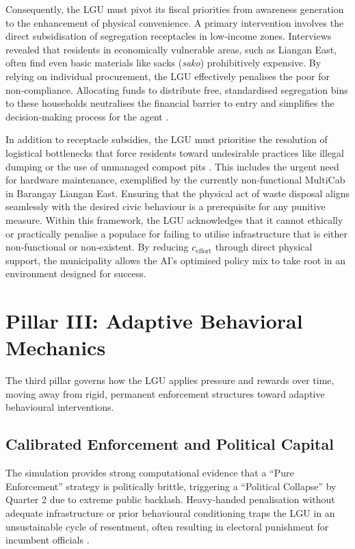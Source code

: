 Consequently, the LGU must pivot its fiscal priorities from awareness generation to the enhancement of physical convenience. A primary intervention involves the direct subsidisation of segregation receptacles in low‑income zones. Interviews revealed that residents in economically vulnerable areas, such as Liangan East, often find even basic materials like sacks (\textit{sako}) prohibitively expensive. By relying on individual procurement, the LGU effectively penalises the poor for non‑compliance. Allocating funds to distribute free, standardised segregation bins to these households neutralises the financial barrier to entry and simplifies the decision‑making process for the agent \citep{Thaler2008}.

In addition to receptacle subsidies, the LGU must prioritise the resolution of logistical bottlenecks that force residents toward undesirable practices like illegal dumping or the use of unmanaged compost pits \citep{Premakumara2014}. This includes the urgent need for hardware maintenance, exemplified by the currently non‑functional MultiCab in Barangay Liangan East. Ensuring that the physical act of waste disposal aligns seamlessly with the desired civic behaviour is a prerequisite for any punitive measure. Within this framework, the LGU acknowledges that it cannot ethically or practically penalise a populace for failing to utilise infrastructure that is either non‑functional or non‑existent. By reducing \(c_{\text{effort}}\) through direct physical support, the municipality allows the AI’s optimised policy mix to take root in an environment designed for success.

\section{Pillar III: Adaptive Behavioral Mechanics}
\label{sec:pillar3}

The third pillar governs how the LGU applies pressure and rewards over time, moving away from rigid, permanent enforcement structures toward adaptive behavioural interventions.

\subsection{Calibrated Enforcement and Political Capital}

The simulation provides strong computational evidence that a “Pure Enforcement” strategy is politically brittle, triggering a “Political Collapse” by Quarter 2 due to extreme public backlash. Heavy‑handed penalisation without adequate infrastructure or prior behavioural conditioning traps the LGU in an unsustainable cycle of resentment, often resulting in electoral punishment for incumbent officials \citep{Weaver1986}. 

